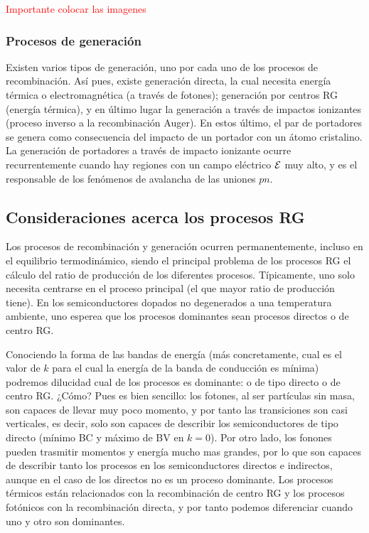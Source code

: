 \begin{Anotacion}
	\textcolor{red}{Importante colocar las imagenes}
\end{Anotacion}

\subsubsection{Procesos de generación}

Existen varios tipos de generación, uno por cada uno de los procesos de recombinación. Así pues, existe generación directa, la cual necesita energía térmica o electromagnética (a través de fotones); generación por centros RG (energía térmica), y en último lugar la generación a través de impactos ionizantes (proceso inverso a la recombinación Auger). En estos último, el par de portadores se genera como consecuencia del impacto de un portador con un átomo cristalino. La generación de portadores a través de impacto ionizante ocurre recurrentemente cuando hay regiones con un campo eléctrico $\mathcal{E}$ muy alto, y es el responsable de los fenómenos de avalancha de las uniones $pn$.

\subsection{Consideraciones acerca los procesos RG}

Los procesos de recombinación y generación ocurren permanentemente, incluso en el equilibrio termodinámico, siendo el principal problema de los procesos RG el cálculo del ratio de producción de los diferentes procesos. Típicamente, uno solo necesita centrarse en el proceso principal (el que mayor ratio de producción tiene). En los semiconductores dopados no degenerados a una temperatura ambiente, uno esperea que los procesos dominantes sean procesos directos o de centro RG.

Conociendo la forma de las bandas de energía (más concretamente, cual es el valor de $k$ para el cual la energía de la banda de conducción es mínima) podremos dilucidad cual de los procesos es dominante: o de tipo directo o de centro RG. ¿Cómo? Pues es bien sencillo: los fotones, al ser partículas sin masa, son capaces de llevar muy poco momento, y por tanto las transiciones son casi verticales, es decir, solo son capaces de describir los semiconductores de tipo directo (mínimo BC y máximo de BV en $k=0$). Por otro lado, los fonones pueden trasmitir momentos y energía mucho mas grandes, por lo que son capaces de describir tanto los procesos en los semiconductores directos e indirectos, aunque en el caso de los directos no es un proceso dominante. Los procesos térmicos están relacionados con la recombinación de centro RG y los procesos fotónicos con la recombinación directa, y por tanto podemos diferenciar cuando uno y otro son dominantes.

